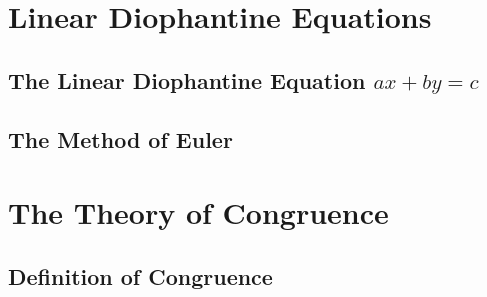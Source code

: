 \documentclass{book}
\theoremstyle{definition}
\theoremstyle{remark}
\begin{document}
\newpage
\section{Linear Diophantine Equations}
\subsection{The Linear Diophantine Equation $ax + by = c$}
\subsection{The Method of Euler}


\newpage
\section{The Theory of Congruence}
\subsection{Definition of Congruence}
\end{document}

